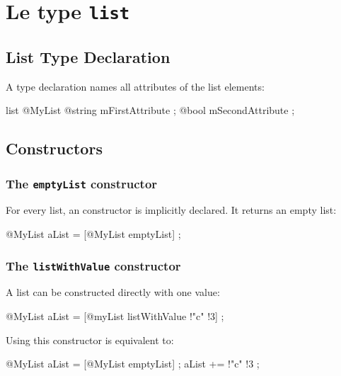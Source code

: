 
\chapter{Le type \texttt{list}}

\section{List Type Declaration}

A  type declaration names all attributes of the list elements:

\begin{galgascode}
list @MyList {
  @string mFirstAttribute ;
  @bool mSecondAttribute ;
}
\end{galgascode}

\section{Constructors}

\subsection{The \texttt{emptyList} constructor}

For every list, an  constructor is implicitly declared. It returns an empty list:

\begin{galgascode}
@MyList aList = [@MyList emptyList] ;
\end{galgascode}


\subsection{The \texttt{listWithValue} constructor}

A list can be constructed directly with one value:

\begin{galgascode}
@MyList aList = [@myList listWithValue !"c" !3] ;
\end{galgascode}


Using this constructor is equivalent to:

\begin{galgascode}
@MyList aList = [@MyList emptyList] ;
aList += !"c" !3 ;
\end{galgascode}

